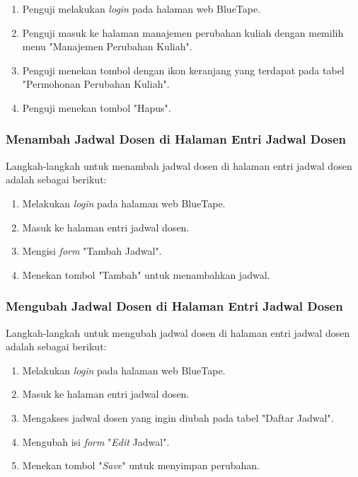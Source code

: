 \begin{enumerate}
    \item Penguji melakukan \textit{login} pada halaman web BlueTape.
    \item Penguji masuk ke halaman manajemen perubahan kuliah dengan memilih menu "Manajemen Perubahan Kuliah".
    \item Penguji menekan tombol dengan ikon keranjang yang terdapat pada tabel "Permohonan Perubahan Kuliah".
    \item Penguji menekan tombol "Hapus".
\end{enumerate}

\subsubsection{Menambah Jadwal Dosen di Halaman Entri Jadwal Dosen}
\label{subsubsec:skenario_menambah_jadwal_dosen_di_halaman_entri_jadwal_dosen}
Langkah-langkah untuk menambah jadwal dosen di halaman entri jadwal dosen adalah sebagai berikut:

\begin{enumerate}
    \item Melakukan \textit{login} pada halaman web BlueTape.
    \item Masuk ke halaman entri jadwal dosen.
    \item Mengisi \textit{form} "Tambah Jadwal".
    \item Menekan tombol "Tambah" untuk menambahkan jadwal.
\end{enumerate}

\subsubsection{Mengubah Jadwal Dosen di Halaman Entri Jadwal Dosen}
\label{subsubsec:skenario_mengubah_jadwal_dosen_di_halaman_entri_jadwal_dosen}
Langkah-langkah untuk mengubah jadwal dosen di halaman entri jadwal dosen adalah sebagai berikut:

\begin{enumerate}
    \item Melakukan \textit{login} pada halaman web BlueTape.
    \item Masuk ke halaman entri jadwal dosen.
    \item Mengakses jadwal dosen yang ingin diubah pada tabel "Daftar Jadwal".
    \item Mengubah isi \textit{form} "\textit{Edit} Jadwal".
    \item Menekan tombol "\textit{Save}" untuk menyimpan perubahan.
\end{enumerate}

